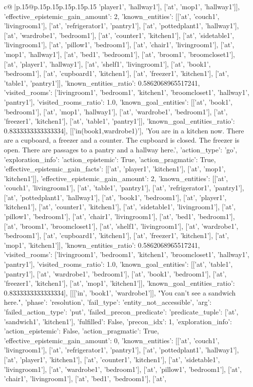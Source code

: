 \documentclass{article}
\begin{document}
{\begin{supertabular}{c@{$\;$}|p{.15\linewidth}@{}p{.15\linewidth}p{.15\linewidth}p{.15\linewidth}p{.15\linewidth}p{.15\linewidth}}
{{{'player1', 'hallway1'], ['at', 'mop1', 'hallway1']], 'effective_epistemic_gain_amount': 2, 'known_entities': [['at', 'couch1', 'livingroom1'], ['at', 'refrigerator1', 'pantry1'], ['at', 'pottedplant1', 'hallway1'], ['at', 'wardrobe1', 'bedroom1'], ['at', 'counter1', 'kitchen1'], ['at', 'sidetable1', 'livingroom1'], ['at', 'pillow1', 'bedroom1'], ['at', 'chair1', 'livingroom1'], ['at', 'mop1', 'hallway1'], ['at', 'bed1', 'bedroom1'], ['at', 'broom1', 'broomcloset1'], ['at', 'player1', 'hallway1'], ['at', 'shelf1', 'livingroom1'], ['at', 'book1', 'bedroom1'], ['at', 'cupboard1', 'kitchen1'], ['at', 'freezer1', 'kitchen1'], ['at', 'table1', 'pantry1']], 'known_entities_ratio': 0.5862068965517241, 'visited_rooms': ['livingroom1', 'bedroom1', 'kitchen1', 'broomcloset1', 'hallway1', 'pantry1'], 'visited_rooms_ratio': 1.0, 'known_goal_entities': [['at', 'book1', 'bedroom1'], ['at', 'mop1', 'hallway1'], ['at', 'wardrobe1', 'bedroom1'], ['at', 'freezer1', 'kitchen1'], ['at', 'table1', 'pantry1']], 'known_goal_entities_ratio': 0.8333333333333334}}], [['in(book1,wardrobe1)'], 'You are in a kitchen now. There are a cupboard, a freezer and a counter. The cupboard is closed. The freezer is open. There are passages to a pantry and a hallway here.', {'action_type': 'go', 'exploration_info': {'action_epistemic': True, 'action_pragmatic': True, 'effective_epistemic_gain_facts': [['at', 'player1', 'kitchen1'], ['at', 'mop1', 'kitchen1']], 'effective_epistemic_gain_amount': 2, 'known_entities': [['at', 'couch1', 'livingroom1'], ['at', 'table1', 'pantry1'], ['at', 'refrigerator1', 'pantry1'], ['at', 'pottedplant1', 'hallway1'], ['at', 'book1', 'bedroom1'], ['at', 'player1', 'kitchen1'], ['at', 'counter1', 'kitchen1'], ['at', 'sidetable1', 'livingroom1'], ['at', 'pillow1', 'bedroom1'], ['at', 'chair1', 'livingroom1'], ['at', 'bed1', 'bedroom1'], ['at', 'broom1', 'broomcloset1'], ['at', 'shelf1', 'livingroom1'], ['at', 'wardrobe1', 'bedroom1'], ['at', 'cupboard1', 'kitchen1'], ['at', 'freezer1', 'kitchen1'], ['at', 'mop1', 'kitchen1']], 'known_entities_ratio': 0.5862068965517241, 'visited_rooms': ['livingroom1', 'bedroom1', 'kitchen1', 'broomcloset1', 'hallway1', 'pantry1'], 'visited_rooms_ratio': 1.0, 'known_goal_entities': [['at', 'table1', 'pantry1'], ['at', 'wardrobe1', 'bedroom1'], ['at', 'book1', 'bedroom1'], ['at', 'freezer1', 'kitchen1'], ['at', 'mop1', 'kitchen1']], 'known_goal_entities_ratio': 0.8333333333333334}}], [[['in', 'book1', 'wardrobe1']], "You can't see a sandwich here.", {'phase': 'resolution', 'fail_type': 'entity_not_accessible', 'arg': {'failed_action_type': 'put', 'failed_precon_predicate': {'predicate_tuple': ['at', 'sandwich1', 'kitchen1'], 'fulfilled': False, 'precon_idx': 1}}, 'exploration_info': {'action_epistemic': False, 'action_pragmatic': True, 'effective_epistemic_gain_amount': 0, 'known_entities': [['at', 'couch1', 'livingroom1'], ['at', 'refrigerator1', 'pantry1'], ['at', 'pottedplant1', 'hallway1'], ['at', 'player1', 'kitchen1'], ['at', 'counter1', 'kitchen1'], ['at', 'sidetable1', 'livingroom1'], ['at', 'wardrobe1', 'bedroom1'], ['at', 'pillow1', 'bedroom1'], ['at', 'chair1', 'livingroom1'], ['at', 'bed1', 'bedroom1'], ['at', }}}
\end{supertabular}}
\end{document}
